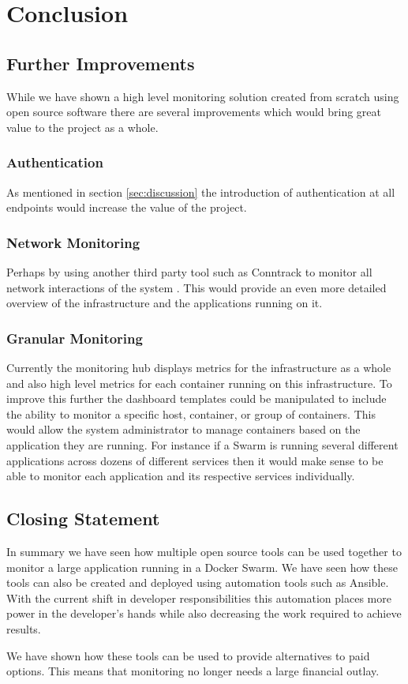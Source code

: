 \section{Conclusion}

\subsection{Further Improvements}
While we have shown a high level monitoring solution created from scratch using open source software there are several improvements which would bring great value to the project as a whole.

\subsubsection{Authentication}
As mentioned in section \ref{sec:discussion} the introduction of authentication at all endpoints would increase the value of the project. 

\subsubsection{Network Monitoring}
Perhaps by using another third party tool such as Conntrack to monitor all network interactions of the system \citep{Conntrack2017}. This would provide an even more detailed overview of the infrastructure and the applications running on it.

\subsubsection{Granular Monitoring}
Currently the monitoring hub displays metrics for the infrastructure as a whole and also high level metrics for each container running on this infrastructure. To improve this further the dashboard templates could be manipulated to include the ability to monitor a specific host, container, or group of containers. This would allow the system administrator to manage containers based on the application they are running. For instance if a Swarm is running several different applications across dozens of different services then it would make sense to be able to monitor each application and its respective services individually.

\subsection{Closing Statement}
In summary we have seen how multiple open source tools can be used together to monitor a large application running in a Docker Swarm. We have seen how these tools can also be created and deployed using automation tools such as Ansible. With the current shift in developer responsibilities this automation places more power in the developer's hands while also decreasing the work required to achieve results.

We have shown how these tools can be used to provide alternatives to paid options. This means that monitoring no longer needs a large financial outlay.
